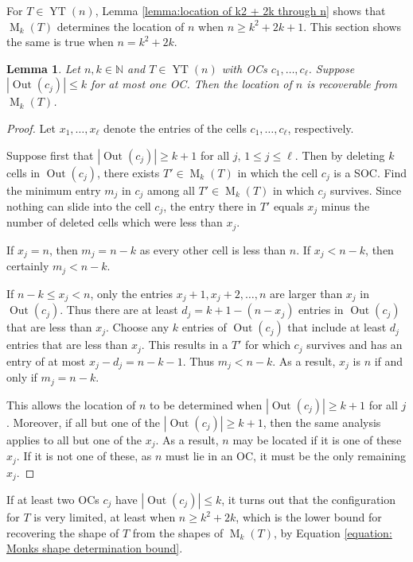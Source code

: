 \documentclass[12pt]{amsart}
\newtheorem{lemma}[theorem]{Lemma}
\theoremstyle{definition}
\theoremstyle{remark}
\numberwithin{equation}{section}
\numberwithin{figure}{section}
\newcommand{\YT}{\operatorname{YT}}
\newcommand{\M}{\operatorname{M}}
\newcommand{\Out}{\operatorname{Out}}
\newcommand{\N}{\mathbb{N}}
\begin{document}
For $T \in \YT(n)$, Lemma \ref{lemma:location of k2 + 2k through n} shows that $\M_k(T)$ determines the location of $n$ when $n \geq k^2 + 2k + 1$. This section shows the same is true when $n = k^2 + 2k$.


\begin{lemma} \label{lemma: outer corner counting}
    Let $n,k\in\N$ and $T\in\YT(n)$ with OCs $c_1, \ldots, c_\ell$.
    Suppose $|\Out(c_j)| \leq k $ for at most one OC. Then the location of $n$ is recoverable from $\M_k(T)$.
\end{lemma}

\begin{proof}
    Let $x_1, \ldots, x_\ell$ denote the entries of the cells $c_1, \ldots, c_\ell$, respectively.

    Suppose first that $|\Out(c_j)| \geq k + 1$ for all $j$, $1\leq j \leq \ell$. Then by deleting $k$ cells in $\Out(c_j)$, there exists $T'\in \M_k(T)$ in which the cell $c_j$ is a SOC. Find the minimum entry $m_j$ in $c_j$ among all $T'\in\M_k(T)$ in which $c_j$ survives. Since nothing can slide into the cell $c_j$, the entry there in $T'$ equals
    $x_j$ minus the number of deleted cells which were less than $x_j$.

    If $x_j = n$, then $m_j = n - k$ as every other cell is less than $n$.
    If $x_j < n - k$, then certainly $m_j < n - k$.

    If $n - k \leq x_j < n$, only the entries $x_j + 1, x_j + 2, \ldots, n$ are larger than $x_j$ in $\Out(c_j)$. Thus there are at least
    $d_j = k + 1 - (n - x_j)$ entries in $\Out(c_j)$ that are less than $x_j$. Choose any $k$ entries of $\Out(c_j)$ that include at least $d_j$ entries that are less than $x_j$. This results in a $T'$ for which $c_j$ survives and has an entry of at most
    $x_j - d_j = n - k - 1$. Thus $m_j < n - k$. As a result, $x_j$ is $n$ if and only if $m_j = n - k$.

    This allows the location of $n$ to be determined when $|\Out(c_j)| \geq k + 1$ for all $j$. Moreover, if all but one of the $|\Out(c_j)| \geq k + 1$, then the same analysis applies to all but one of the $x_j$. As a result, $n$ may be located if it is one of these $x_j$. If it is not one of these, as $n$ must lie in an OC, it must be the only remaining $x_j$.
\end{proof}







If at least two OCs $c_j$ have $|\Out(c_j)| \leq k$, it turns out that the configuration for $T$ is very limited, at least when $n \geq k^2 +2k$, which is the lower bound for recovering the shape of $T$ from the shapes of $\M_k(T)$, by Equation \eqref{equation: Monks shape determination bound}.
\end{document}

